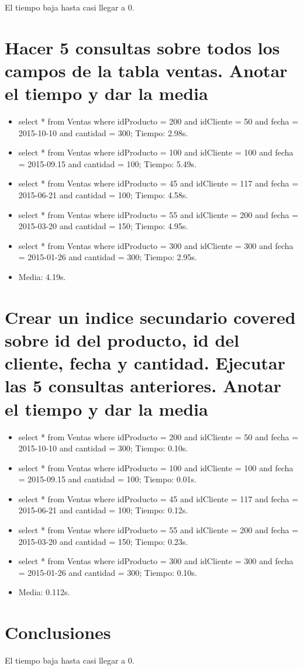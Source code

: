 \documentclass[a4paper,12pt]{article}
\begin{document}
   El tiempo baja hasta casi llegar a 0.
  
  \section{Hacer 5 consultas sobre todos los campos de la tabla ventas. Anotar el tiempo y dar la media}
  
  \begin{itemize}
   \item select * from Ventas where idProducto = 200 and idCliente = 50 and fecha = 2015-10-10 and cantidad = 300; Tiempo: 2.98s.
   \item select * from Ventas where idProducto = 100 and idCliente = 100 and fecha = 2015-09.15 and cantidad = 100; Tiempo: 5.49s.
   \item select * from Ventas where idProducto = 45 and idCliente = 117 and fecha = 2015-06-21 and cantidad = 100; Tiempo: 4.58s.
   \item select * from Ventas where idProducto = 55 and idCliente = 200 and fecha = 2015-03-20 and cantidad = 150; Tiempo: 4.95s.
   \item select * from Ventas where idProducto = 300 and idCliente = 300 and fecha = 2015-01-26 and cantidad = 300; Tiempo: 2.95s.
   \item Media: 4.19s.
  \end{itemize}

  \section{Crear un indice secundario covered sobre id del producto, id del cliente, fecha y cantidad.
  Ejecutar las 5 consultas anteriores. Anotar el tiempo y dar la media}
  
  \begin{itemize}
   \item select * from Ventas where idProducto = 200 and idCliente = 50 and fecha = 2015-10-10 and cantidad = 300; Tiempo: 0.10s.
   \item select * from Ventas where idProducto = 100 and idCliente = 100 and fecha = 2015-09.15 and cantidad = 100; Tiempo: 0.01s.
   \item select * from Ventas where idProducto = 45 and idCliente = 117 and fecha = 2015-06-21 and cantidad = 100; Tiempo: 0.12s.
   \item select * from Ventas where idProducto = 55 and idCliente = 200 and fecha = 2015-03-20 and cantidad = 150; Tiempo: 0.23s.
   \item select * from Ventas where idProducto = 300 and idCliente = 300 and fecha = 2015-01-26 and cantidad = 300; Tiempo: 0.10s.
   \item Media: 0.112s.
  \end{itemize}
  
  \section{Conclusiones}
  
  El tiempo baja hasta casi llegar a 0.
  
\end{document}
